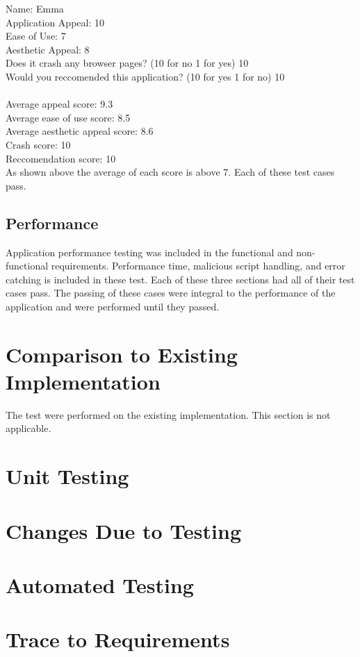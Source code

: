 \documentclass[12pt, titlepage]{article}
\begin{document}
Name: Emma\\
Application Appeal: 10 \\ 
Ease of Use: 7\\ 
Aesthetic Appeal: 8\\ 
Does it crash any browser pages? (10 for no 1 for yes) 10\\ 
Would you reccomended this application? (10 for yes 1 for no) 10\\ 
\\
Average appeal score:  9.3
\\
Average ease of use score: 8.5
\\
Average aesthetic appeal score: 8.6
\\
Crash score: 10
\\
Reccomendation score: 10
\\
As shown above the average of each score is above 7. Each of these test cases pass.
\subsection{Performance}
Application performance testing was included in the functional and non-functional requirements. Performance time, malicious script handling, and error catching is included in these test. Each of these three sections had all of their test cases pass. The passing of these cases were integral to the performance of the application and were performed until they passed. 
	
\section{Comparison to Existing Implementation}	
The test were performed on the existing implementation. This section is not applicable.
\section{Unit Testing}

\section{Changes Due to Testing}

\section{Automated Testing}
		
\section{Trace to Requirements}
\end{document}
